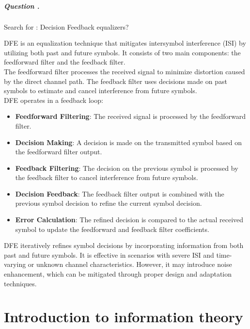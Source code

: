 \documentclass[14pt,a4paper]{report}
\newcounter{question}
\newcommand*\question{%
\stepcounter{question}%
\paragraph{Question \thesection.\thequestion}}
\begin{document}
\question
{
    Search for : Decision Feedback equalizers?
}
\begin{answer_box*}
    DFE is an equalization technique that mitigates intersymbol interference (ISI) by utilizing both past and future symbols. It consists of two main components: the feedforward filter and the feedback filter.\\
    The feedforward filter processes the received signal to minimize distortion caused by the direct channel path. The feedback filter uses decisions made on past symbols to estimate and cancel interference from future symbols.\\
    DFE operates in a feedback loop:

\begin{itemize}
    \item \textbf{Feedforward Filtering}: The received signal is processed by the feedforward filter.
    \item \textbf{Decision Making}: A decision is made on the transmitted symbol based on the feedforward filter output.
    \item \textbf{Feedback Filtering}: The decision on the previous symbol is processed by the feedback filter to cancel interference from future symbols.
    \item \textbf{Decision Feedback}: The feedback filter output is combined with the previous symbol decision to refine the current symbol decision.
    \item \textbf{Error Calculation}: The refined decision is compared to the actual received symbol to update the feedforward and feedback filter coefficients.
\end{itemize}
    DFE iteratively refines symbol decisions by incorporating information from both past and future symbols. It is effective in scenarios with severe ISI and time-varying or unknown channel characteristics. However, it may introduce noise enhancement, which can be mitigated through proper design and adaptation techniques.
\end{answer_box*}

%
%

\chapter{Introduction to information theory}
\noindent\makebox[\linewidth]{\rule{\textwidth}{0.4pt}}
\end{document}
